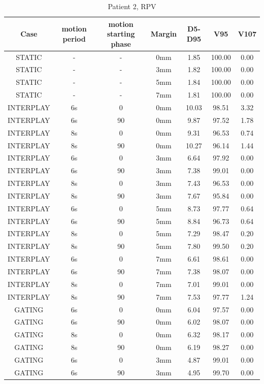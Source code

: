 \documentclass[type=dr, dr=rernat, accentcolor=tud7b,colorbacktitle, bigchapter, openright, twoside, 12pt ]{tudthesis}
\begin{document}
\begin{table}[H]
  \centering
  \caption{Patient 2, RPV}
  \begin{tabular}{|c||c|c|c||c|c|c|}
    \hline\hline
    Case & motion period & motion starting phase & Margin & D5-D95 & V95 & V107\\
    \hline 
STATIC & - & - & 0mm & 1.85 & 100.00 & 0.00 \\
STATIC & - & - & 3mm & 1.82 & 100.00 & 0.00 \\
STATIC & - & - & 5mm & 1.84 & 100.00 & 0.00 \\
STATIC & - & - & 7mm & 1.81 & 100.00 & 0.00 \\
INTERPLAY & 6s & 0 & 0mm & 10.03 & 98.51 & 3.32 \\
INTERPLAY & 6s & 90 & 0mm & 9.87 & 97.52 & 1.78 \\
INTERPLAY & 8s & 0 & 0mm & 9.31 & 96.53 & 0.74 \\
INTERPLAY & 8s & 90 & 0mm & 10.27 & 96.14 & 1.44 \\
INTERPLAY & 6s & 0 & 3mm & 6.64 & 97.92 & 0.00 \\
INTERPLAY & 6s & 90 & 3mm & 7.38 & 99.01 & 0.00 \\
INTERPLAY & 8s & 0 & 3mm & 7.43 & 96.53 & 0.00 \\
INTERPLAY & 8s & 90 & 3mm & 7.67 & 95.84 & 0.00 \\
INTERPLAY & 6s & 0 & 5mm & 8.73 & 97.77 & 0.64 \\
INTERPLAY & 6s & 90 & 5mm & 8.84 & 96.73 & 0.64 \\
INTERPLAY & 8s & 0 & 5mm & 7.29 & 98.47 & 0.20 \\
INTERPLAY & 8s & 90 & 5mm & 7.80 & 99.50 & 0.20 \\
INTERPLAY & 6s & 0 & 7mm & 6.61 & 98.61 & 0.00 \\
INTERPLAY & 6s & 90 & 7mm & 7.38 & 98.07 & 0.00 \\
INTERPLAY & 8s & 0 & 7mm & 7.01 & 99.01 & 0.00 \\
INTERPLAY & 8s & 90 & 7mm & 7.53 & 97.77 & 1.24 \\
GATING & 6s & 0 & 0mm & 6.04 & 97.57 & 0.00 \\
GATING & 6s & 90 & 0mm & 6.02 & 98.07 & 0.00 \\
GATING & 8s & 0 & 0mm & 6.32 & 98.17 & 0.00 \\
GATING & 8s & 90 & 0mm & 6.19 & 98.27 & 0.00 \\
GATING & 6s & 0 & 3mm & 4.87 & 99.01 & 0.00 \\
GATING & 6s & 90 & 3mm & 4.95 & 99.70 & 0.00 \\

\end{tabular}
\end{table}
\end{document}
